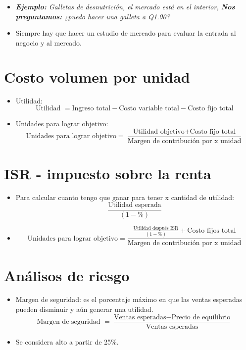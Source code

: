 \begin{itemize}
    \item \emph{\textbf{Ejemplo: }Galletas de desnutrición, el mercado está en el interior, \textbf{Nos preguntamos:} ¿puedo hacer una galleta a Q1.00?}
    \item Siempre hay que hacer un estudio de mercado para evaluar la entrada al negocio y al mercado.
\end{itemize}


\section{Costo volumen por unidad}
\begin{itemize}
    \item Utilidad:  
    \[
      \text{Utilidad } = \text{Ingreso total} - \text{Costo variable total} - \text{Costo fijo total}
    \]
    
    \item Unidades para lograr objetivo: 
        \[
         \text{Unidades para lograr objetivo} = \frac{\text{Utilidad objetivo} + \text{Costo fijo total}}{\text{Margen de contribución por x unidad}} 
        \]
\end{itemize}

\section{ISR - impuesto sobre la renta}
\begin{itemize}
    \item Para calcular cuanto tengo que ganar para tener x cantidad de utilidad:
        \[
          \frac{\text{Utilidad esperada}}{(1-\%)} 
        \]
    
    \item 
        \[
          \text{Unidades para lograr objetivo} = \frac{\frac{\text{Utilidad después ISR}}{(1-\%)} + \text{Costo fijos total}}{\text{Margen de contribución por x unidad}} 
        \]
\end{itemize}

\section{Análisos de riesgo}
\begin{itemize}
    \item Margen de seguridad: es el porcentaje máximo en que las ventas esperadas pueden disminuir y aún generar una utilidad.
        \[
          \text{Margen de seguridad } = \frac{\text{Ventas esperadas} - \text{Precio de equilibrio}}{\text{Ventas esperadas}} 
        \]
    
    \item Se considera alto a partir de 25\%. 
\end{itemize}


